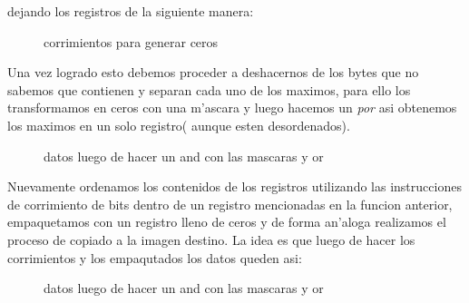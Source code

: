 dejando los registros de la siguiente manera: \\
\begin{figure}[hb]
\caption{corrimientos para generar ceros}
\label{est:m-uno}
\end{figure}
Una vez logrado esto debemos proceder a deshacernos de los bytes que no sabemos que contienen y separan
cada uno de los maximos, para ello los transformamos en ceros con una m'ascara y luego hacemos un \textit{por} 
asi obtenemos los maximos en un solo registro( aunque esten desordenados).\\
\begin{figure}[hb]
\caption{datos luego de hacer un and con las mascaras y or}
\label{est:m-uno}
\end{figure}
Nuevamente ordenamos los contenidos de los registros utilizando las instrucciones de corrimiento de bits
dentro de un registro mencionadas en la funcion anterior, empaquetamos con un registro lleno de ceros
 y de forma an'aloga realizamos el proceso de copiado a la imagen destino. La idea es que luego de
hacer los corrimientos y los empaqutados los datos queden asi:\\
\begin{figure}[hb]

\caption{datos luego de hacer un and con las mascaras y or}
\label{est:m-uno}
\end{figure}




 
 

